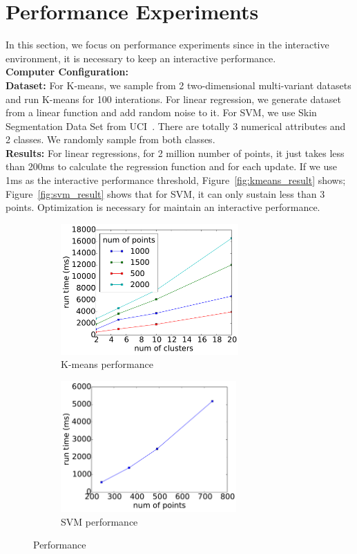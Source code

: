 \documentclass{article}
\begin{document}
\section{Performance Experiments}
In this section, we focus on performance experiments since in the interactive environment, it is necessary to keep an interactive performance. \\
\textbf{Computer Configuration:} \\
\textbf{Dataset:} For K-means, we sample from 2 two-dimensional multi-variant datasets and run K-means for 100 interations. For linear regression, we generate dataset from a linear function and add random noise to it. For SVM, we use Skin Segmentation Data Set from UCI~\cite{skinsegment}.  There are totally 3 numerical attributes and 2 classes. We randomly sample from both classes. \\
\textbf{Results:} For linear regressions, for 2 million number of points, it just takes less than 200ms to calculate the regression function and for each update.  If we use 1ms as the interactive performance threshold, Figure~\ref{fig:kmeans_result} shows; Figure~\ref{fig:svm_result} shows that for SVM, it can only sustain less than 3 points. Optimization is necessary for maintain an interactive performance. \\

\begin{figure}[t!]
	\centering
	\begin{subfigure}{0.47\textwidth}
		\centering
		\includegraphics[height=5cm]{figs/kmeans_result}
		\caption{K-means performance}
	\end{subfigure}%
	\begin{subfigure}{0.47\textwidth}
		\centering
		\includegraphics[height=5cm]{figs/svm_result}
		\caption{SVM performance}
	\end{subfigure}
	\caption{Performance}
\end{figure}
\end{document}
